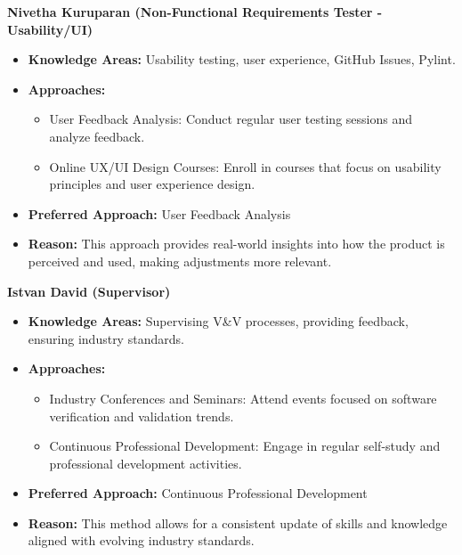 \documentclass[12pt, titlepage]{article}
\begin{document}
\begin{appendices}
\begin{itemize}
    \textbf{Nivetha Kuruparan (Non-Functional Requirements Tester - Usability/UI)}
    \begin{itemize}
        \item \textbf{Knowledge Areas:} Usability testing, user experience, GitHub Issues, Pylint.
        \item \textbf{Approaches:}
        \begin{itemize}
            \item User Feedback Analysis: Conduct regular user testing sessions and analyze feedback.
            \item Online UX/UI Design Courses: Enroll in courses that focus on usability principles and user experience design.
        \end{itemize}
        \item \textbf{Preferred Approach:} User Feedback Analysis
        \item \textbf{Reason:} This approach provides real-world insights into how the product is perceived and used, making adjustments more relevant.
    \end{itemize}

    \textbf{Istvan David (Supervisor)}
    \begin{itemize}
        \item \textbf{Knowledge Areas:} Supervising V\&V processes, providing feedback, ensuring industry standards.
        \item \textbf{Approaches:}
        \begin{itemize}
            \item Industry Conferences and Seminars: Attend events focused on software verification and validation trends.
            \item Continuous Professional Development: Engage in regular self-study and professional development activities.
        \end{itemize}
        \item \textbf{Preferred Approach:} Continuous Professional Development
        \item \textbf{Reason:} This method allows for a consistent update of skills and knowledge aligned with evolving industry standards.
    \end{itemize}

\end{itemize}

\end{appendices}
\end{document}
